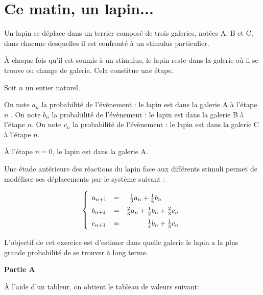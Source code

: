 \documentclass{cornouaille}
\begin{document}
\section{Ce matin, un lapin...}
\begin{exercice}
Un lapin se déplace dans un terrier composé de trois galeries, notées A, B et C, dans chacune desquelles il est confronté à un stimulus particulier.

À chaque fois qu'il est soumis à un stimulus, le lapin reste dans la galerie où il se trouve ou change de galerie. Cela constitue une étape.

\smallskip

Soit $n$ un entier naturel.

On note $a_n$ la probabilité de l'évènement : \og le lapin est dans la galerie A à l'étape $n$ \fg.
On note $b_n$ la probabilité de l'évènement : \og le lapin est dans la galerie B à l'étape $n $\fg.
On note $c_n$ la probabilité de l'évènement : \og le lapin est dans la galerie C à l'étape $n $\fg.

À l'étape $n = 0$, le lapin est dans la galerie A.

Une étude antérieure des réactions du lapin face aux différents stimuli permet de modéliser ses déplacements par le système suivant :

\[\renewcommand\arraystretch{1.5}\left\{\begin{array}{l c r}
a_{n+1}&=&\frac{1}{3}a_n + \frac{1}{4} b_n \phantom{+ \frac{2}{3}c_n}\\
b_{n+1}&=&\frac{2}{3}a_n + \frac{1}{2} b_n + \frac{2}{3}c_n\\
c_{n+1}&=&\frac{1}{4}b_n + \frac{1}{3} c_n
\end{array}\right.\]

\medskip

L'objectif de cet exercice est d'estimer dans quelle galerie le lapin a la plus grande probabilité de se trouver à long terme.

\bigskip

\textbf{Partie A}

\medskip

À l'aide d'un tableur, on obtient le tableau de valeurs suivant:


\end{exercice}
\end{document}

